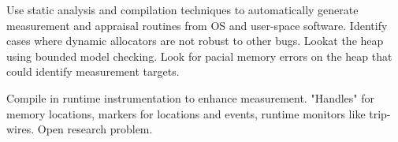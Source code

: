 \documentclass[runningheads]{llncs}
\begin{document}
Use static analysis and compilation techniques to automatically generate measurement and appraisal routines from OS and user-space software.
Identify cases where dynamic allocators are not robust to other bugs. Lookat the heap using bounded model checking.  Look for pacial memory errors on the heap that could identify measurement targets.

Compile in runtime instrumentation to enhance measurement.  "Handles" for memory locations, markers for locations and events, runtime monitors like trip-wires.  Open research problem.

% 
% 
%
%
%

%

%
\end{document}
